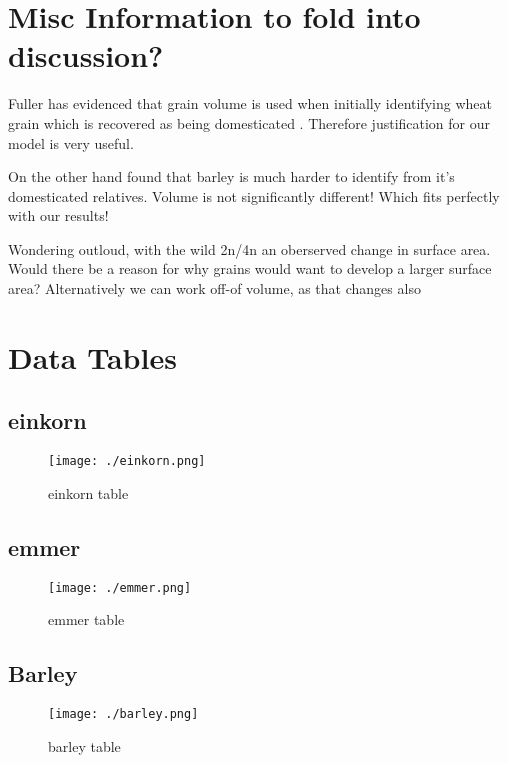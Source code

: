 \documentclass[a4paper, twocolumn]{article}
\begin{document}
\section{Misc Information to fold into discussion?}
\label{sec:orgdee0062}

Fuller has evidenced that grain volume is used when initially identifying wheat grain which is recovered as being domesticated \cite{Fuller2007} .
Therefore justification for our model is very useful.

On the other hand \cite{Willcox2004} found that barley is much harder to identify from it's domesticated relatives.
 Volume is not significantly different! Which fits perfectly with our results!

Wondering outloud, with the wild 2n/4n an oberserved change in surface area. Would there be a
reason for why grains would want to develop a larger surface area? Alternatively we can work off-of volume, as that changes also

\clearpage
\onecolumn
\section{Data Tables}
\label{sec:org29d101a}

\subsection{einkorn}
\label{sec:orgeaf88c5}
\begin{figure}[htbp]
\centering
\texttt{[image: ./einkorn.png]}
\caption{\label{fig:org62f1159}
einkorn table}
\end{figure}


\subsection{emmer}
\label{sec:org7266207}
\begin{figure}[htbp]
\centering
\texttt{[image: ./emmer.png]}
\caption{\label{fig:org60d0038}
emmer table}
\end{figure}

\clearpage


\subsection{Barley}
\label{sec:orgf491518}
\begin{figure}[htbp]
\centering
\texttt{[image: ./barley.png]}
\caption{\label{fig:org6fcf241}
barley table}
\end{figure}
\end{document}
